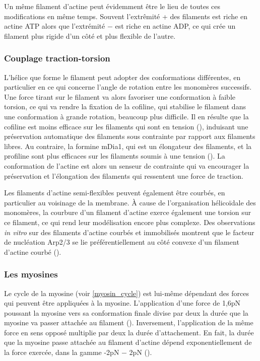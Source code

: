 Un même filament d'actine peut évidemment être le lieu de toutes ces modifications en même temps. Souvent l'extrêmité + des filaments est riche en actine ATP alors que l'extrémité $-$ est riche en actine ADP, ce qui crée un filament plus rigide d'un côté et plus flexible de l'autre. 

\subsubsection{Couplage traction-torsion}

L'hélice que forme le filament peut adopter des conformations différentes, en particulier en ce qui concerne l'angle de rotation entre les monomères successifs. 
Une force tirant sur le filament va alors favoriser une conformation à faible torsion, ce qui va rendre la fixation de la cofiline, qui stabilise le filament dans une conformation à grande rotation, beaucoup plus difficile. 
Il en résulte que la cofiline est moins efficace sur les filaments qui sont en tension (\cite{hayakawa_actin_2011}), induisant une préservation automatique des filaments sous contrainte par rapport aux filaments libres. 
Au contraire, la formine mDia1, qui est un élongateur des filaments, et la profiline sont plus efficaces sur les filaments soumis à une tension (\cite{higashida_f-_2013}). 
La conformation de l'actine est alors un senseur de contrainte qui va encourager la préservation et l'élongation des filaments qui ressentent une force de traction. 

Les filaments d'actine semi-flexibles peuvent également être courbés, en particulier au voisinage de la membrane. 
À cause de l'organisation hélicoïdale des monomères, la courbure d'un filament d'actine exerce également une torsion sur ce filament, ce qui rend leur modélisation encore plus complexe. 
Des observations \textit{in vitro} sur des filaments d'actine courbés et immobilisés montrent que le facteur de nucléation Arp2/3 se lie préférentiellement au côté convexe d'un filament d'actine courbé (\cite{risca_actin_2012}). 

\subsubsection{Les myosines}

Le cycle de la myosine (voir \ref{myosin_cycle}) est lui-même dépendant des forces qui peuvent être appliquées à la myosine. 
L'application d'une force de 1,6pN poussant la myosine vers sa conformation finale divise par deux la durée que la myosine va passer attachée au filament 
(\cite{veigel_load-dependent_2003}). 
Inversement, l'application de la même force en sens opposé multiplie par deux la durée d'attachement. 
En fait, la durée que la myosine passe attachée au filament d'actine dépend exponentiellement de la force exercée, dans la gamme -2pN $-$ 2pN (\cite{veigel_load-dependent_2003}). 

